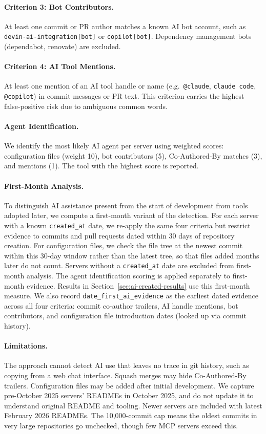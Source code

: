 \documentclass[manuscript,screen,nonacm,oneside]{acmart}
\begin{document}
\paragraph{Criterion 3: Bot Contributors.}
At least one commit or PR author matches a known AI bot account, such as \texttt{devin-ai-integration[bot]} or \texttt{copilot[bot]}. Dependency management bots
(dependabot, renovate) are excluded.

\paragraph{Criterion 4: AI Tool Mentions.}
At least one mention of an AI tool handle or name (e.g.\ \texttt{@claude}, \texttt{claude code}, \texttt{@copilot}) in commit messages or PR text. This criterion carries the highest false-positive risk due to ambiguous common words.

\paragraph{Agent Identification.}
We identify the most likely AI agent per server using weighted scores: configuration files (weight 10), bot contributors (5), Co-Authored-By matches (3), and mentions (1). The tool with the highest score is reported.

\paragraph{First-Month Analysis.}
To distinguish AI assistance present from the start of development from tools adopted later, we compute a first-month variant of the detection. For each server with a known \texttt{created\_at} date, we re-apply the same four criteria but restrict evidence to commits and pull requests dated within 30 days of repository creation. For configuration files, we check the file tree at the newest commit within this 30-day window rather than the latest tree, so that files added months later do not count. Servers without a \texttt{created\_at} date are excluded from first-month analysis. The agent identification scoring is applied separately to first-month evidence. Results in Section~\ref{sec:ai-created-results} use this first-month measure. We also record \texttt{date\_first\_ai\_evidence} as the earliest dated evidence across all four criteria: commit co-author trailers, AI handle mentions, bot contributors, and configuration file introduction dates (looked up via commit history).

\paragraph{Limitations.}
The approach cannot detect AI use that leaves no trace in git history, such as copying from a web chat interface. Squash merges may hide Co-Authored-By trailers. Configuration files may be added after initial development. We capture pre-October 2025 servers' READMEs in October 2025, and do not update it to understand original README and tooling. Newer servers are included with latest February 2026 READMEs. The 10,000-commit cap means the oldest commits in very large repositories go unchecked, though few MCP servers exceed this.
\end{document}
